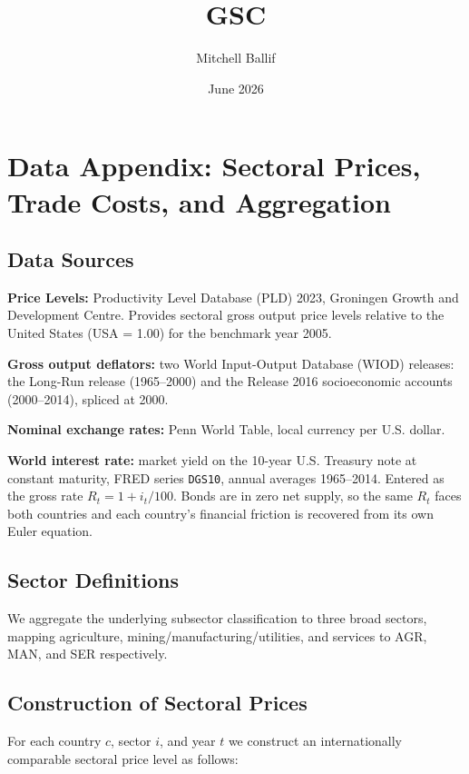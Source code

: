 \documentclass{article}
\title{GSC}
\author{Mitchell Ballif}
\date{June 2026}
\begin{document}
\maketitle

\section*{Data Appendix: Sectoral Prices, Trade Costs, and Aggregation}

\subsection*{Data Sources}

\textbf{Price Levels:} Productivity Level Database (PLD) 2023, Groningen Growth and Development
Centre. Provides sectoral gross output price levels relative to the United States (USA = 1.00) for
the benchmark year 2005.

\textbf{Gross output deflators:} two World Input-Output Database (WIOD) releases: the Long-Run
release (1965--2000) and the Release 2016 socioeconomic accounts (2000--2014), spliced at 2000.

\textbf{Nominal exchange rates:} Penn World Table, local currency per U.S. dollar.

\textbf{World interest rate:} market yield on the 10-year U.S. Treasury note at constant maturity,
FRED series \texttt{DGS10}, annual averages 1965--2014. Entered as the gross rate
$R_t = 1 + i_t/100$. Bonds are in zero net supply, so the same $R_t$ faces both countries and each
country's financial friction is recovered from its own Euler equation.

\subsection*{Sector Definitions}

We aggregate the underlying subsector classification to three broad sectors, mapping agriculture,
mining/manufacturing/utilities, and services to AGR, MAN, and SER respectively.

\subsection*{Construction of Sectoral Prices}

For each country $c$, sector $i$, and year $t$ we construct an internationally comparable sectoral
price level as follows:
\end{document}
